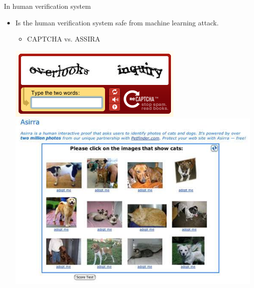 \documentclass[first=dgreen,second=purple,logo=yellowexc]{aaltoslides}
\begin{document}
{\begin{frame}{In human verification system}
	\begin{itemize}
		\item Is the human verification system safe from machine learning attack.
		\begin{itemize}
			\footnotesize
			\item CAPTCHA vs. ASSIRA
		\end{itemize}
		\begin{center}
			\includegraphics[scale=0.2]{./figures/captcha.png}
			\text{     }
			\includegraphics[scale=0.2]{./figures/assira.jpg}
		\end{center}
	\end{itemize}
\end{frame}

}
\end{document}
